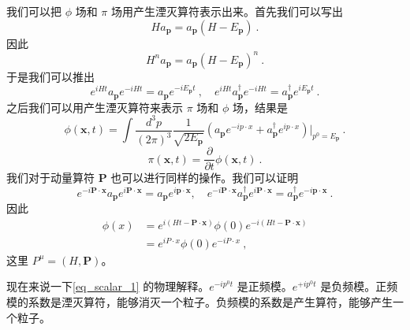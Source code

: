 我们可以把 $\phi$ 场和 $\pi$ 场用产生湮灭算符表示出来。首先我们可以写出
\begin{equation}
H a_{\mathbf p} = a_{\mathbf p} (H - E_{\mathbf p})~.
\end{equation}
因此
\begin{equation}
H^n a_{\mathbf p} = a_{\mathbf p} (H - E_{\mathbf p})^n~.
\end{equation}
于是我们可以推出
\begin{equation}
e^{iHt} a_{\mathbf p} e^{-iHt} = a_{\mathbf p} e^{-i E_{\mathbf p}t}~, \quad e^{iHt} a^\dagger_{\mathbf p} e^{-iHt} = a^\dagger_{\mathbf p} e^{iE_{\mathbf p}t} ~.
\end{equation}
之后我们可以用产生湮灭算符来表示 $\pi$ 场和 $\phi$ 场，结果是
\begin{equation}\label{eq_scalar_1}
\phi(\mathbf x,t)= \int \frac{d^3 p }{(2\pi)^3} \frac{1}{\sqrt{2E_{\mathbf p}}} (a_{\mathbf p} e^{-i p \cdot x} + a^\dagger_{\mathbf p} e^{i p \cdot x}) \bigg|_{p^0 = E_{\mathbf p}}~.
\end{equation}
\begin{equation}
\pi(\mathbf x, t) = \frac{\partial}{\partial t} \phi(\mathbf x, t)~.
\end{equation}
我们对于动量算符 $\mathbf P$ 也可以进行同样的操作。我们可以证明
\begin{equation}
e^{-i \mathbf{P} \cdot \mathbf{x}} a_{\mathbf{p}} e^{i \mathbf{P} \cdot \mathbf{x}}=a_{\mathbf{p}} e^{i \mathbf{p} \cdot \mathbf{x}}, \quad e^{-i \mathbf{P} \cdot \mathbf{x}} a_{\mathbf{p}}^{\dagger} e^{i \mathbf{P} \cdot \mathbf{x}}=a_{\mathbf{p}}^{\dagger} e^{-i \mathbf{p} \cdot \mathbf{x}}~.
\end{equation}
因此
\begin{equation}
\begin{aligned}
\phi(x) &=e^{i(H t-\mathbf{P} \cdot \mathbf{x})} \phi(0) e^{-i(H t-\mathbf{P} \cdot \mathbf{x})} \\
&=e^{i P \cdot x} \phi(0) e^{-i P \cdot x}~,
\end{aligned}
\end{equation}
这里 $P^\mu = (H,\mathbf P)$。

现在来说一下\autoref{eq_scalar_1} 的物理解释。$e^{-i p^0 t}$ 是正频模。$e^{+i p^0 t}$ 是负频模。正频模的系数是湮灭算符，能够消灭一个粒子。负频模的系数是产生算符，能够产生一个粒子。


